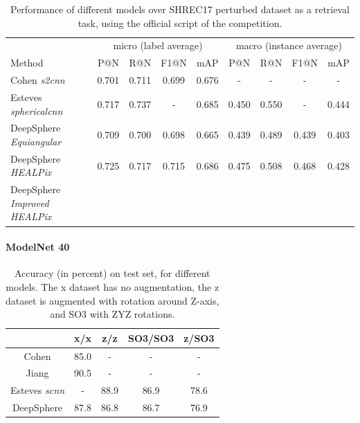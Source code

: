 \documentclass{article} %
\begin{document}
\begin{table}
    \centering
    \begin{tabular}{l|c c c c|c c c c}
     & \multicolumn{4}{c|}{micro (label average)} & \multicolumn{4}{c}{macro (instance average)} \\
    Method & P@N & R@N & F1@N & mAP & P@N & R@N & F1@N & mAP \\ \hline
    Cohen \emph{s2cnn} & 0.701 & 0.711 & 0.699 & 0.676 & - & - & - & - \\
    Esteves \emph{sphericalcnn} & 0.717 & 0.737 & - & 0.685 & 0.450 & 0.550 & - & 0.444\\ \hline
    DeepSphere \emph{Equiangular} & 0.709 & 0.700 & 0.698 & 0.665 & 0.439 & 0.489 & 0.439 & 0.403 \\
    DeepSphere \emph{HEALPix} & 0.725 & 0.717 & 0.715 & 0.686 & 0.475 & 0.508 & 0.468 & 0.428\\
    DeepSphere \emph{Improved HEALPix} & & & & &
    \end{tabular}
    \caption{Performance of different models over SHREC17 perturbed dataset as a retrieval task, using the official script of the competition.}
    \label{tab:SHREC17_retriev}
\end{table}

\paragraph*{ModelNet 40}

\begin{table}
    \centering
    \begin{tabular}{c|cccc}
         &  x/x & z/z & SO3/SO3 & z/SO3 \\ \hline
Cohen & 85.0 & - & - & - \\
Jiang & 90.5 & - & - & - \\
Esteves \emph{scnn} & - & 88.9 & 86.9 & 78.6 \\
DeepSphere & 87.8 & 86.8 & 86.7 & 76.9
    \end{tabular}
    \caption{Accuracy (in percent) on test set, for different models. The x dataset has no augmentation, the z dataset is augmented with rotation around Z-axis, and SO3 with ZYZ rotations.}
    \label{tab:mn40_results}
\end{table}
\end{document}
